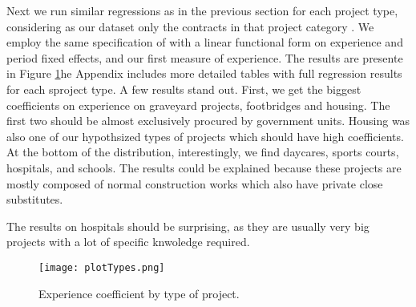      Next we run similar regressions as in the previous section for each project type, considering as our dataset only the contracts in that project category . We employ the same specification of with a linear functional form on experience and period fixed effects, and our first measure of experience. The results are presente in Figure \ref{fig:typeestimates}he Appendix includes more detailed tables with full regression results for each sproject type. A few results stand out. First, we get the biggest coefficients on experience on graveyard projects, footbridges and housing. The first two should be almost exclusively procured by government units. Housing was also one of our hypothsized types of projects which should have high coefficients. At the bottom of the distribution, interestingly, we find daycares, sports courts, hospitals, and schools. The results could be explained because these projects are mostly composed of normal construction works which also have private close substitutes.

     The results on hospitals should be surprising, as they are usually very big projects with a lot of specific knwoledge required.


     \begin{figure}
       \texttt{[image: plotTypes.png]}
       \caption{Experience coefficient by type of project.}
       \label{fig:typeestimates}
     \end{figure}
